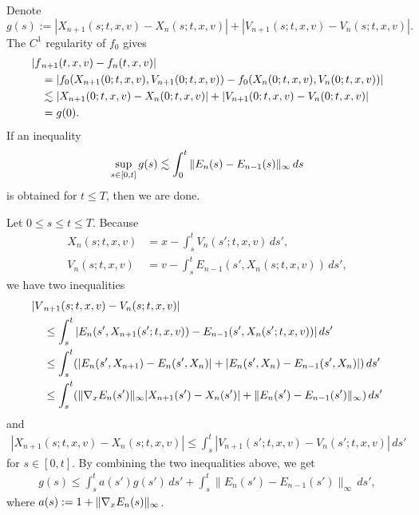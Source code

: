 \documentclass[11pt]{amsart}
\begin{document}
\begin{pfs}
\item
Denote
\[g(s):=|X_{n+1}(s;t,x,v)-X_n(s;t,x,v)|+|V_{n+1}(s;t,x,v)-V_n(s;t,x,v)|.\]
The $C^1$ regularity of $f_0$ gives
\begin{align*}
|f&_{n+1}(t,x,v)-f_n(t,x,v)|\\
&=|f_0(X_{n+1}(0;t,x,v),V_{n+1}(0;t,x,v))-f_0(X_n(0;t,x,v),V_n(0;t,x,v))|\\
&\lesssim|X_{n+1}(0;t,x,v)-X_n(0;t,x,v)|+|V_{n+1}(0;t,x,v)-V_n(0;t,x,v)|\\
&=g(0).
\end{align*}
If an inequality
\[\sup_{s\in[0,t]}g(s)\lesssim\int_0^t\|E_n(s)-E_{n-1}(s)\|_\infty\,ds\]
is obtained for $t\le T$, then we are done.

Let $0\le s\le t\le T$.
Because
\begin{align*}
X_n(s;t,x,v)&=x-\int_s^tV_n(s';t,x,v)\,ds',\\
V_n(s;t,x,v)&=v-\int_s^tE_{n-1}(s',X_n(s;t,x,v))\,ds',
\end{align*}
we have two inequalities
\begin{align*}
|V&_{n+1}(s;t,x,v)-V_n(s;t,x,v)|\\
&\le\int_s^t|E_n(s',X_{n+1}(s';t,x,v))-E_{n-1}(s',X_n(s';t,x,v))|\,ds'\\
&\le\int_s^t(|E_n(s',X_{n+1})-E_n(s',X_n)|+|E_n(s',X_n)-E_{n-1}(s',X_n)|)\,ds'\\
&\le\int_s^t(\|\nabla_xE_n(s')\|_\infty|X_{n+1}(s')-X_n(s')|+\|E_n(s')-E_{n-1}(s')\|_\infty)\,ds'
\end{align*}
and
\begin{align*}
|X_{n+1}(s;t,x,v)-X_n(s;t,x,v)|\le\int_s^t|V_{n+1}(s';t,x,v)-V_n(s';t,x,v)|\,ds'
\end{align*}
for $s\in[0,t]$.
By combining the two inequalities above, we get
\begin{align}\label{ggw}
g(s)\le\int_s^ta(s')g(s')\,ds'+\int_s^t\|E_n(s')-E_{n-1}(s')\|_\infty\,ds',
\end{align}
where $a(s):=1+\|\nabla_xE_n(s)\|_\infty$.


\end{pfs}
\end{document}
